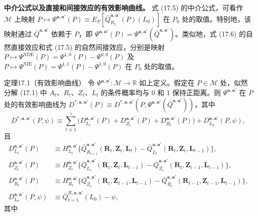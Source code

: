 \noindent\textbf{中介公式以及直接和间接效应的有效影响曲线。}
式 (17.5) 的中介公式，可看作 $\mathcal M$ 上映射 $P\mapsto\Psi^{\mathbf a,\mathbf a'}(P)\equiv E_P[\bar Q_{R_1}^{\mathbf a,\mathbf a'}(P)(L_0)]$ 在 $P_0$ 处的取值。特别地，该映射通过 $\bar Q^{\mathbf a,\mathbf a'}$ 依赖于 $P$，即 $\Psi^{\mathbf a,\mathbf a'}(P)=\Psi^{\mathbf a,\mathbf a'}(\bar Q^{\mathbf a,\mathbf a'})$。类似地，式 (17.6) 的自然直接效应和式 (17.5) 的自然间接效应，分别是映射 $P\mapsto\Psi^{\mathrm{NDE}}(P)=\Psi^{1,0}(P)-\Psi^{0,0}(P)$ 及 $P\mapsto\Psi^{\mathrm{NIE}}(P)=\Psi^{1,1}(P)-\Psi^{1,0}(P)$ 在 $P_0$ 处的取值。

\begin{bookresult}{定理}{17.1（有效影响曲线）}
令 $\Psi^{\mathbf a,\mathbf a'}:\mathcal M\to\mathbb R$ 如上定义。假定在 $P\in\mathcal M$ 处，似然分解 (17.1) 中 $A_t$、$R_t$、$Z_t$、$L_t$ 的条件概率均与 0 和 1 保持正距离。则 $\Psi^{\mathbf a,\mathbf a'}$ 在 $P$ 处的有效影响曲线为
$D^{*,\mathbf a,\mathbf a'}(P)\equiv D^{*,\mathbf a,\mathbf a'}(P,\Psi^{\mathbf a,\mathbf a'}(\bar Q^{\mathbf a,\mathbf a'}))$，其中
\begin{equation}
 D^{*,\mathbf a,\mathbf a'}(P,\psi)
 \equiv\sum_{t\equiv1}^\tau\bigl(D_{L_t}^{\mathbf a,\mathbf a'}(P)
 +D_{Z_t}^{\mathbf a,\mathbf a'}(P)+D_{R_t}^{\mathbf a,\mathbf a'}(P)\bigr)
 +D_{L_0}^{\mathbf a,\mathbf a'}(P,\psi),
 \tag{17.9}
\end{equation}
且
\[
\begin{aligned}
 D_{L_t}^{\mathbf a,\mathbf a'}(P)
 &\equiv H_{L_t}^{\mathbf a,\mathbf a'}\bigl\{
 \bar Q_{R_{t+1}}^{\mathbf a,\mathbf a'}(\mathbf R_t,\mathbf Z_t,\mathbf L_t)
 -\bar Q_{L_t}^{\mathbf a,\mathbf a'}(\mathbf R_t,\mathbf Z_t,\mathbf L_{t-1})\bigr\},\\
 D_{Z_t}^{\mathbf a,\mathbf a'}(P)
 &\equiv H_{Z_t}^{\mathbf a,\mathbf a'}\bigl\{
 \bar Q_{L_t}^{\mathbf a,\mathbf a'}(\mathbf R_t,\mathbf Z_t,\mathbf L_{t-1})
 -\bar Q_{Z_t}^{\mathbf a,\mathbf a'}(\mathbf R_t,\mathbf Z_{t-1},\mathbf L_{t-1})\bigr\},\\
 D_{R_t}^{\mathbf a,\mathbf a'}(P)
 &\equiv H_{R_t}^{\mathbf a,\mathbf a'}\bigl\{
 \bar Q_{Z_t}^{\mathbf a,\mathbf a'}(\mathbf R_t,\mathbf Z_{t-1},\mathbf L_{t-1})
 -\bar Q_{R_t}^{\mathbf a,\mathbf a'}(\mathbf R_{t-1},\mathbf Z_{t-1},\mathbf L_{t-1})\bigr\},\\
 D_{L_0}^{\mathbf a,\mathbf a'}(P,\psi)
 &\equiv\bar Q_{t=1}^{R,\mathbf a,\mathbf a'}(L_0)-\psi,
\end{aligned}
\]
其中
\begin{equation}

\end{equation}
\end{bookresult}
